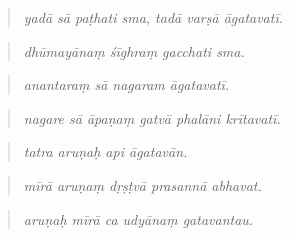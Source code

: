 \begin{tcolorbox}[breakable,skin=enhanced,colback=orange!6,colframe=orange!45!black,boxrule=0.5pt,arc=1mm,left=6pt,right=6pt,top=4pt,bottom=4pt,fonttitle=\bfseries,title={Read this}]
\begin{quote}
\emph{yadā sā paṭhati sma, tadā varṣā āgatavatī.}
\end{quote}

\begin{quote}
\textbf{   }
\end{quote}

\begin{quote}
\emph{dhūmayānaṃ śīghraṃ gacchati sma.}
\end{quote}

\begin{quote}
\textbf{   }
\end{quote}

\begin{quote}
\emph{anantaraṃ sā nagaram āgatavatī.}
\end{quote}

\begin{quote}
\textbf{     }
\end{quote}

\begin{quote}
\emph{nagare sā āpaṇaṃ gatvā phalāni krītavatī.}
\end{quote}

\begin{quote}
\textbf{   }
\end{quote}

\begin{quote}
\emph{tatra aruṇaḥ api āgatavān.}
\end{quote}

\begin{quote}
\textbf{    }
\end{quote}

\begin{quote}
\emph{mīrā aruṇaṃ dṛṣṭvā prasannā abhavat.}
\end{quote}

\begin{quote}
\textbf{    }
\end{quote}

\begin{quote}
\emph{aruṇaḥ mīrā ca udyānaṃ gatavantau.}
\end{quote}

\begin{quote}
\textbf{   }
\end{quote}


\end{tcolorbox}
